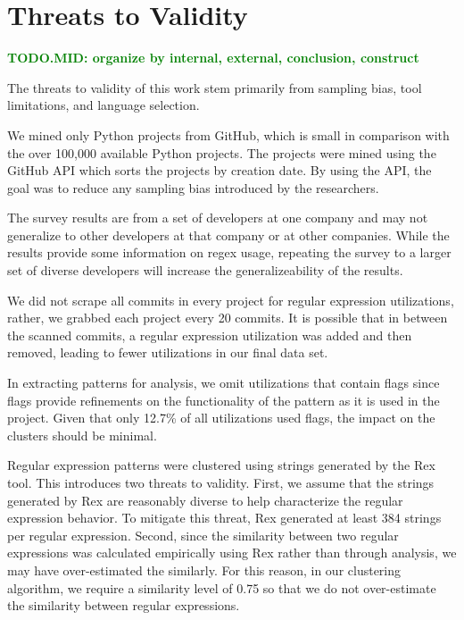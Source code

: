 \documentclass{sig-alternate}
\newcommand{\todoMid}[1]{\textbf{\textcolor{green}{TODO.MID: #1}}} %
\begin{document}
\section{Threats to Validity}
\label{sec:threats}
\todoMid{organize by internal, external, conclusion, construct}

The threats to validity of this work stem primarily from sampling bias, tool limitations, and language selection.

We mined only  Python projects from GitHub, which is  small in comparison with the over 100,000 available Python projects. The projects were mined using the GitHub API which sorts the projects by creation date. By using the API, the goal was to reduce any sampling bias introduced by the researchers.

The survey results are from a set of developers at one company and may not generalize to other developers at that company or at other companies. While the results provide some information on regex usage, repeating the survey to a larger set of diverse developers will increase the generalizeability of the results.

We did not scrape all commits in every project for regular expression utilizations, rather, we grabbed each project every 20 commits. It is possible that in between the scanned commits, a regular expression utilization was added and then removed, leading to fewer utilizations in our final data set.

In extracting patterns for analysis, we omit utilizations that contain flags since flags provide refinements on the functionality of the pattern as it is used in the project. Given that only 12.7\% of all utilizations used flags, the impact on the clusters should be minimal.


Regular expression patterns were clustered using strings generated by the Rex tool. This introduces two threats to validity. First, we assume that the strings generated by Rex are reasonably diverse to help characterize the regular expression behavior. To mitigate this threat, Rex generated at least 384 strings per regular expression. Second, since the similarity between two regular expressions was calculated empirically using Rex rather than through analysis, we may have over-estimated the similarly. For this reason, in our clustering algorithm, we require a similarity level of 0.75 so that we do not over-estimate the similarity between regular  expressions.
\end{document}
